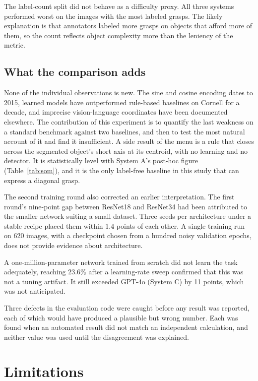 \documentclass[12pt,letterpaper]{article}
\begin{document}
The label-count split did not behave as a difficulty proxy. All three
systems performed worst on the images with the most labeled grasps. The
likely explanation is that annotators labeled more grasps on objects
that afford more of them, so the count reflects object complexity more
than the leniency of the metric.

\subsection{What the comparison adds}

None of the individual observations is new. The sine and cosine encoding
dates to 2015, learned models have outperformed rule-based baselines on
Cornell for a decade, and imprecise vision-language coordinates have
been documented elsewhere. The contribution of this experiment is to
quantify the last weakness on a standard benchmark against two
baselines, and then to test the most natural account of it and find it
insufficient. A side result of the menu is a rule that closes across the
segmented object's short axis at its centroid, with no learning and no
detector. It is statistically level with System A's post-hoc figure
(Table~\ref{tab:som}), and it is the only label-free baseline in this
study that can express a diagonal grasp.

The second training round also corrected an earlier interpretation. The
first round's nine-point gap between ResNet18 and ResNet34 had been
attributed to the smaller network suiting a small dataset. Three seeds
per architecture under a stable recipe placed them within 1.4 points of
each other. A single training run on 620 images, with a checkpoint
chosen from a hundred noisy validation epochs, does not provide evidence
about architecture.

A one-million-parameter network trained from scratch did not learn the
task adequately, reaching 23.6\% after a learning-rate sweep confirmed
that this was not a tuning artifact. It still exceeded GPT-4o (System C)
by 11 points, which was not anticipated.

Three defects in the evaluation code were caught before any result was
reported, each of which would have produced a plausible but wrong
number. Each was found when an automated result did not match an
independent calculation, and neither value was used until the
disagreement was explained.

\section{Limitations}
\end{document}

